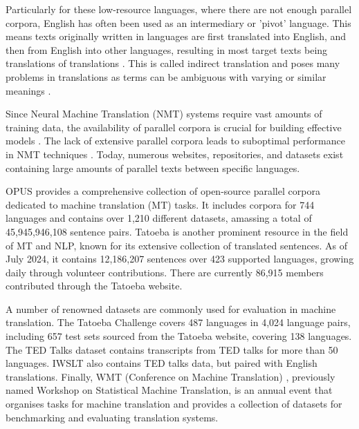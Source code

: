 \documentclass[a4paper, 11pt]{article}
\begin{document}
Particularly for these low-resource languages, where there are not enough parallel corpora, English has often been used as an intermediary or 'pivot' language. This means texts originally written in languages are first translated into English, and then from English into other languages, resulting in most target texts being translations of translations \cite{lefer-2020-parallel-corpora}. This is called indirect translation and poses many problems in translations as terms can be ambiguous with varying or similar meanings \cite{rosa-2017-indirect-translation-problems}.

Since Neural Machine Translation (NMT) systems require vast amounts of training data, the availability of parallel corpora is crucial for building effective models \cite{koehn-2017-challenges}. The lack of extensive parallel corpora leads to suboptimal performance in NMT techniques \cite{ranathunga-2023-nmt-low-res}. Today, numerous websites, repositories, and datasets exist containing large amounts of parallel texts between specific languages.

OPUS \cite{tiedemann-2012-opus-parallel} provides a comprehensive collection of open-source parallel corpora dedicated to machine translation (MT) tasks. It includes corpora for 744 languages and contains over 1,210 different datasets, amassing a total of 45,945,946,108 sentence pairs. Tatoeba \cite{tatoeba} is another prominent resource in the field of MT and NLP, known for its extensive collection of translated sentences. As of July 2024, it contains 12,186,207 sentences over 423 supported languages, growing daily through volunteer contributions. There are currently
86,915 members contributed through the Tatoeba website.

A number of renowned datasets are commonly used for evaluation in machine translation. The Tatoeba Challenge \cite{tiedemann-2020-tatoeba-challenge} covers 487 languages in 4,024 language pairs, including 657 test sets sourced from the Tatoeba website, covering 138 languages. The TED Talks dataset \cite{ye-2018-word-embeddings-ted} contains transcripts from TED talks for more than 50 languages. IWSLT \cite{agarwal-iwstl-2023} also contains TED talks data, but paired with English translations. Finally, WMT (Conference on Machine Translation) \cite{barrault-2020-wmt}, previously named Workshop on Statistical Machine Translation, is an annual event that organises tasks for machine translation and provides a collection of datasets for benchmarking and evaluating translation systems.
\end{document}
